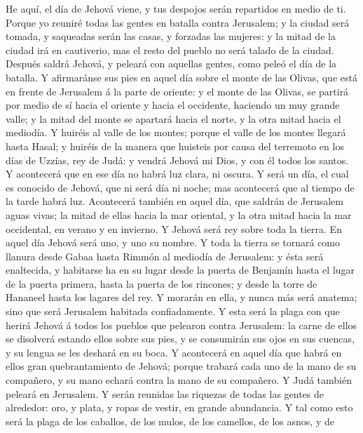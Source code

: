  He aquí, el día de Jehová viene, y tus despojos serán
repartidos en medio de ti.  Porque yo reuniré todas las
gentes en batalla contra Jerusalem; y la ciudad será tomada, y saqueadas
serán las casas, y forzadas las mujeres: y la mitad de la ciudad irá en
cautiverio, mas el resto del pueblo no será talado de la ciudad.
 Después saldrá Jehová, y peleará con aquellas gentes, como
peleó el día de la batalla.  Y afirmaránse sus pies en aquel
día sobre el monte de las Olivas, que está en frente de Jerusalem á la
parte de oriente: y el monte de las Olivas, se partirá por medio de sí
hacia el oriente y hacia el occidente, haciendo un muy grande valle; y
la mitad del monte se apartará hacia el norte, y la otra mitad hacia el
mediodía.  Y huiréis al valle de los montes; porque el valle
de los montes llegará hasta Hasal; y huiréis de la manera que huisteis
por causa del terremoto en los días de Uzzías, rey de Judá: y vendrá
Jehová mi Dios, y con él todos los santos.  Y acontecerá que
en ese día no habrá luz clara, ni oscura.  Y será un día, el
cual es conocido de Jehová, que ni será día ni noche; mas acontecerá que
al tiempo de la tarde habrá luz.  Acontecerá también en
aquel día, que saldrán de Jerusalem aguas vivas; la mitad de ellas hacia
la mar oriental, y la otra mitad hacia la mar occidental, en verano y en
invierno.  Y Jehová será rey sobre toda la tierra. En aquel
día Jehová será uno, y uno su nombre.  Y toda la tierra se
tornará como llanura desde Gabaa hasta Rimmón al mediodía de Jerusalem:
y ésta será enaltecida, y habitarse ha en su lugar desde la puerta de
Benjamín hasta el lugar de la puerta primera, hasta la puerta de los
rincones; y desde la torre de Hananeel hasta los lagares del rey.
 Y morarán en ella, y nunca más será anatema; sino que será
Jerusalem habitada confiadamente.  Y esta será la plaga con
que herirá Jehová á todos los pueblos que pelearon contra Jerusalem: la
carne de ellos se disolverá estando ellos sobre sus pies, y se
consumirán sus ojos en sus cuencas, y su lengua se les deshará en su
boca.  Y acontecerá en aquel día que habrá en ellos gran
quebrantamiento de Jehová; porque trabará cada uno de la mano de su
compañero, y su mano echará contra la mano de su compañero.
 Y Judá también peleará en Jerusalem. Y serán reunidas las
riquezas de todas las gentes de alrededor: oro, y plata, y ropas de
vestir, en grande abundancia.  Y tal como esto será la
plaga de los caballos, de los mulos, de los camellos, de los asnos, y de
